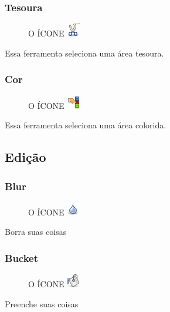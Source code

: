 \documentclass[12pt,onecolumn]{article}
\begin{document}
      \subsubsection{Tesoura}
      \begin{figure}[H]
        O ÍCONE
        \includegraphics{gimp-icons/stock-tool-iscissors-22.png}
        \label{fig:scissorsselect}
      \end{figure}
      Essa ferramenta seleciona uma área tesoura.
      
      \subsubsection{Cor}
      \begin{figure}[H]
        O ÍCONE
        \includegraphics{gimp-icons/stock-tool-by-color-select-22.png}
        \label{fig:colorselect}
      \end{figure}
      Essa ferramenta seleciona uma área colorida.


  \subsection{Edição}
    \subsubsection{Blur}
      \begin{figure}[H]
        O ÍCONE
        \includegraphics{gimp-icons/stock-tool-blur-22.png}
        \label{fig:blur}
      \end{figure}
      Borra suas coisas

  \subsubsection{Bucket}
      \begin{figure}[H]
        O ÍCONE
        \includegraphics{gimp-icons/stock-tool-bucket-fill-22.png}
        \label{fig:bucket}
      \end{figure}
      Preenche suas coisas
    
\end{document}
